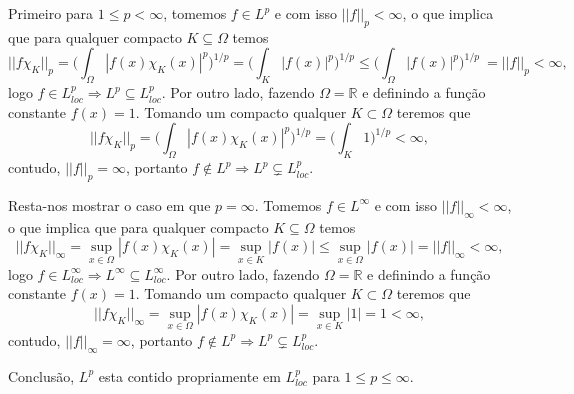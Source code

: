 \documentclass{article}
\begin{document}
\begin{enumerate}
\begin{enumerate}
			Primeiro para $1 \leq p < \infty$, tomemos $f \in L^{p}$ e com isso $||f||_{p} < \infty$, o que implica que para qualquer compacto $K \subseteq \Omega$ temos 
			$$
			||f\chi_{K}||_{p} = \Big( \int_{\Omega}|f(x)\chi_{K} (x)|^{p} \Big)^{1/p}= \Big( \int_{K}|f(x)|^{p} \Big)^{1/p} \leq \Big( \int_{\Omega}|f(x)|^{p} \Big)^{1/p} \ = ||f||_{p} < \infty,
			$$
			logo $f \in L^{p}_{loc} \Rightarrow L^{p} \subseteq L^{p}_{loc}$. Por outro lado, fazendo $\Omega = \mathbb{R}$ e definindo a função constante $f(x) = 1$. Tomando um compacto qualquer $K \subset \Omega$ teremos que 
			$$
			||f \chi_{K}||_{p} = \Big( \int_{\Omega} |f(x)\chi_{K}(x)|^{p} \Big)^{1/p} = \Big( \int_{K} 1 \Big)^{1/p} < \infty,
			$$
			contudo, 
			$||f||_{p} = \infty$, portanto $f \notin L^{p} \Rightarrow L^{p} \subsetneq L^{p}_{loc}$.
			
			Resta-nos mostrar o caso em que $p=\infty$. Tomemos $f \in L^{\infty}$ e com isso $||f||_{\infty} < \infty$, o que implica que para qualquer compacto $K \subseteq \Omega$ temos 
			$$
			||f\chi_{K}||_{\infty} = \sup_{x \in \Omega}|f(x)\chi_{K} (x)|= \sup_{x \in K}|f(x)| \leq \sup_{x \in \Omega}|f(x)| = ||f||_{\infty} < \infty,
			$$
			logo $f \in L^{\infty}_{loc} \Rightarrow L^{\infty} \subseteq L^{\infty}_{loc}$. Por outro lado, fazendo $\Omega = \mathbb{R}$ e definindo a função constante $f(x) = 1$. Tomando um compacto qualquer $K \subset \Omega$ teremos que 
			$$
			||f \chi_{K}||_{\infty} = \sup_{x \in \Omega}|f(x)\chi_{K} (x)| = \sup_{x \in K}|1| = 1 < \infty,
			$$
			contudo, 
			$||f||_{\infty} = \infty$, portanto $f \notin L^{p} \Rightarrow L^{p} \subsetneq L^{p}_{loc}$.
			
			Conclusão, $L^{p}$ esta contido propriamente em $L^{p}_{loc}$ para $1 \leq p \leq \infty$.
			

\end{enumerate}
\end{enumerate}
\end{document}
